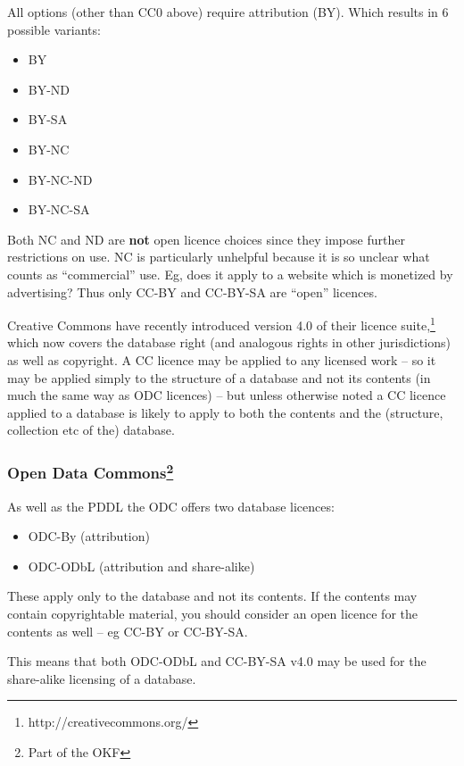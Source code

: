 All options (other than CC0 above) require attribution (BY). Which
results in 6 possible variants:

\begin{itemize}
\item
  BY
\item
  BY-ND
\item
  BY-SA
\item
  BY-NC
\item
  BY-NC-ND
\item
  BY-NC-SA
\end{itemize}

Both NC and ND are \textbf{not} open licence choices since they impose
further restrictions on use. NC is particularly unhelpful because it is
so unclear what counts as ``commercial'' use. Eg, does it apply to a
website which is monetized by advertising? Thus only CC-BY and CC-BY-SA
are ``open'' licences.

Creative Commons have recently introduced version 4.0 of their licence
suite,\footnote{http://creativecommons.org/} which now covers the
database right (and analogous rights in other jurisdictions) as well as
copyright. A CC licence may be applied to any licensed work -- so it may
be applied simply to the structure of a database and not its contents
(in much the same way as ODC licences) -- but unless otherwise noted a
CC licence applied to a database is likely to apply to both the contents
and the (structure, collection etc of the) database.

\subsubsection[Open Data Commons]{Open Data Commons\footnote{Part of the
  OKF}}\label{open-data-commons21}

As well as the PDDL the ODC offers two database licences:

\begin{itemize}
\item
  ODC-By (attribution)
\item
  ODC-ODbL (attribution and share-alike)
\end{itemize}

These apply only to the database and not its contents. If the contents
may contain copyrightable material, you should consider an open licence
for the contents as well -- eg CC-BY or CC-BY-SA.

This means that both ODC-ODbL and CC-BY-SA v4.0 may be used for the
share-alike licensing of a database.

